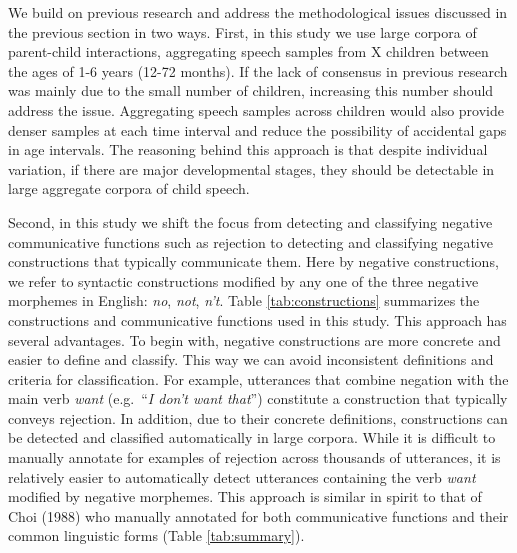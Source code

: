 \documentclass[
  english,
  man,floatsintext]{apa6}
\begin{document}
We build on previous research and address the methodological issues discussed in the previous section in two ways. First, in this study we use large corpora of parent-child interactions, aggregating speech samples from X children between the ages of 1-6 years (12-72 months). If the lack of consensus in previous research was mainly due to the small number of children, increasing this number should address the issue. Aggregating speech samples across children would also provide denser samples at each time interval and reduce the possibility of accidental gaps in age intervals. The reasoning behind this approach is that despite individual variation, if there are major developmental stages, they should be detectable in large aggregate corpora of child speech.

Second, in this study we shift the focus from detecting and classifying negative communicative functions such as rejection to detecting and classifying negative constructions that typically communicate them. Here by negative constructions, we refer to syntactic constructions modified by any one of the three negative morphemes in English: \emph{no}, \emph{not}, \emph{n't}. Table \ref{tab:constructions} summarizes the constructions and communicative functions used in this study. This approach has several advantages. To begin with, negative constructions are more concrete and easier to define and classify. This way we can avoid inconsistent definitions and criteria for classification. For example, utterances that combine negation with the main verb \emph{want} (e.g.~``\emph{I don't want that}'') constitute a construction that typically conveys rejection. In addition, due to their concrete definitions, constructions can be detected and classified automatically in large corpora. While it is difficult to manually annotate for examples of rejection across thousands of utterances, it is relatively easier to automatically detect utterances containing the verb \emph{want} modified by negative morphemes. This approach is similar in spirit to that of Choi (1988) who manually annotated for both communicative functions and their common linguistic forms (Table \ref{tab:summary}).
\end{document}
